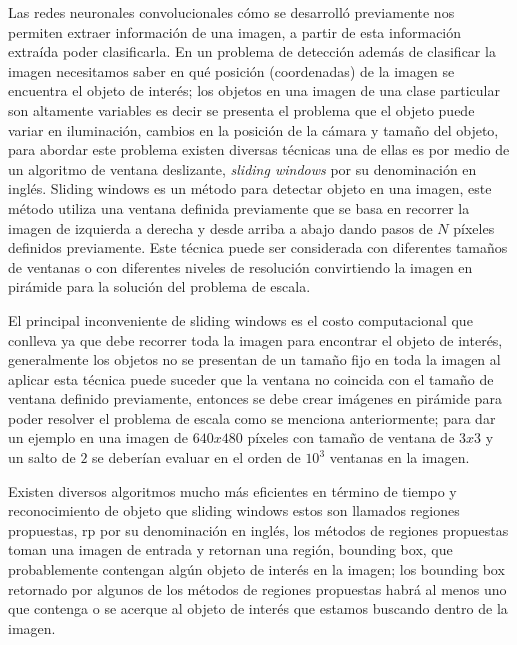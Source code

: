 Las redes neuronales convolucionales cómo se desarrolló previamente nos permiten extraer información de una imagen, a partir de esta información extraída poder clasificarla. En un problema de detección además de clasificar la imagen necesitamos saber en qué posición (coordenadas) de la imagen se encuentra el objeto de interés; los objetos en una imagen de una clase particular son altamente variables es decir se presenta el problema que el objeto puede variar en iluminación, cambios en la posición de la cámara y tamaño del objeto, para abordar este problema existen diversas técnicas una de ellas es por medio de un algoritmo de ventana deslizante, \textit{sliding windows} por su denominación en inglés. Sliding windows es un método para detectar objeto en una imagen, este método utiliza una ventana definida previamente que se basa en recorrer la imagen de izquierda a derecha y desde arriba a abajo dando pasos de $N$ píxeles definidos previamente. Este técnica puede ser considerada con diferentes tamaños de ventanas o con diferentes niveles de resolución convirtiendo la imagen en pirámide para la solución del problema de escala. 

El principal inconveniente de sliding windows es el costo computacional que conlleva ya que debe recorrer toda la imagen para encontrar el objeto de interés, generalmente los objetos no se presentan de un tamaño fijo en toda la imagen al aplicar esta técnica puede suceder que la ventana no coincida con el tamaño de ventana definido previamente, entonces se debe crear imágenes en pirámide para poder resolver el problema de escala como se menciona anteriormente; para dar un ejemplo en una imagen de $640 x 480$ píxeles con tamaño de ventana de $ 3 x 3$ y un salto de $2$ se deberían evaluar en el orden de $10^3$ ventanas en la imagen.

Existen diversos algoritmos mucho más eficientes en término de tiempo y reconocimiento de objeto que sliding windows estos son llamados regiones propuestas, \ac{rp} por su denominación en inglés, los métodos de regiones propuestas toman una imagen de entrada y retornan una región, bounding box,  que probablemente contengan algún objeto de interés en la imagen; los bounding box retornado por algunos de los métodos de regiones propuestas habrá al menos uno que contenga o se acerque al objeto de interés que estamos buscando dentro de la imagen.

